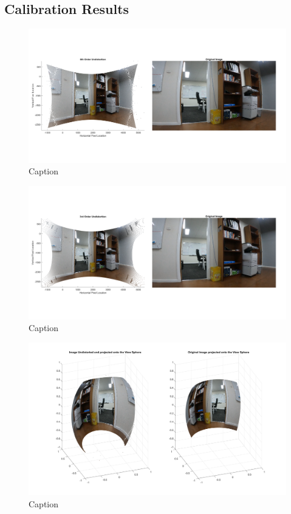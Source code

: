 \documentclass{UoNMCHA}
\numberwithin{equation}{section}
\begin{document}
\subsection{Calibration Results}
\begin{figure}[ht]
    \begin{center}
        \includegraphics[width=.8\linewidth]{Figures/Matlab/6rdOrderUndistort}
        \caption{Caption}
        \label{fig:6rdOrderUndistort}
    \end{center}
\end{figure}
\begin{figure}[ht]
    \begin{center}
        \includegraphics[width=.8\linewidth]{Figures/Matlab/3rdOrderUndistort}
        \caption{Caption}
        \label{fig:3rdOrderUndistort}
    \end{center}
\end{figure}
\begin{figure}[ht]
    \begin{center}
        \includegraphics[width=.8\linewidth]{Figures/Matlab/Image_on_ViewSphere}
        \caption{Caption}
        \label{fig:Image_on_ViewSphere}
    \end{center}
\end{figure}
\newpage
\end{document}
